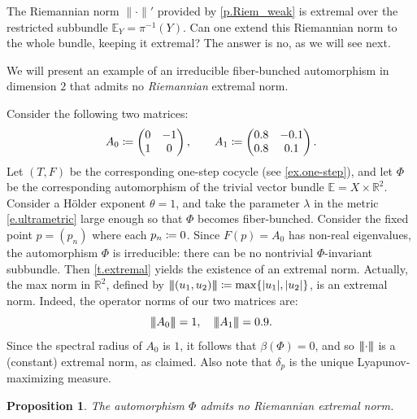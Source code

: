 \documentclass[JEP,XML,SOM,Unicode]{cedram}
\def\vcentcolon{\mathrel{\mathop\ordinarycolon}}
\providecommand\ordinarycolon{:}
\providecommand*\coloneqq{\vcentcolon\mathrel{\mkern-1.2mu}=}
\theoremstyle{plain}
\newtheorem{proposition}[theorem]{Proposition}
\theoremstyle{definition}
\newcommand{\tribar}[1]{\mathopen{| {\kern -1.5pt} | {\kern -1.5pt} |} {#1}
\mathclose{| {\kern -1.5pt} | {\kern -1.5pt} |}}
\newcommand{\RR}{\mathbb{R}}
\newcommand{\EE}{\mathbb{E}}
\begin{document}
The Riemannian norm $\| \mathord{\cdot} \|'$ provided by \cref{p.Riem_weak} is extremal over the restricted subbundle $\EE_Y = \pi^{-1}(Y)$. Can one extend this Riemannian norm to the whole bundle, keeping it extremal?
The answer is no, as we will see next.

We will present an example of an irreducible fiber-bunched automorphism in dimension $2$ that admits no \emph{Riemannian} extremal norm.

Consider the following two matrices:
\begin{equation}\label{e.two_matrices}
A_0 \coloneqq \begin{pmatrix} 0 & -1 \\ 1 & 0 \end{pmatrix}, \qquad
A_1 \coloneqq \begin{pmatrix} 0.8 & -0.1 \\ 0.8 & 0.1 \end{pmatrix}.
\end{equation}
Let $(T,F)$ be the corresponding one-step cocycle (see \cref{ex.one-step}),
and let $\Phi$ be the corresponding automorphism of the trivial vector bundle $\EE = X \times \RR^2$.
Consider a Hölder exponent $\theta = 1$, and take the parameter $\lambda$ in the metric \eqref{e.ultrametric} large enough so that $\Phi$ becomes fiber-bunched.
Consider the fixed point $p=(p_n)$ where each $p_n \coloneqq 0$.
Since $F(p) = A_0$ has non-real eigenvalues, the automorphism $\Phi$ is irreducible: there can be no nontrivial $\Phi$-invariant subbundle.
Then \cref{t.extremal} yields the existence of an extremal norm.
Actually, the max norm in $\RR^2$, defined by
$\tribar{(u_1,u_2)} \coloneqq \max\{|u_1|,|u_2|\}$, is an extremal norm.
Indeed, the operator norms of our two matrices are:
\[
\tribar{A_0} = 1, \quad \tribar{A_1} = 0.9.
\]
Since the spectral radius of $A_0$ is $1$, it follows that $\beta(\Phi) = 0$, and so $\tribar{\mathord{\cdot}}$ is a (constant) extremal norm, as claimed. Also note that $\delta_p$ is the unique Lyapunov-maximizing measure.

\begin{proposition}\label{p.no_Riemann}
The automorphism $\Phi$ admits no Riemannian extremal norm.
\end{proposition}
\end{document}
